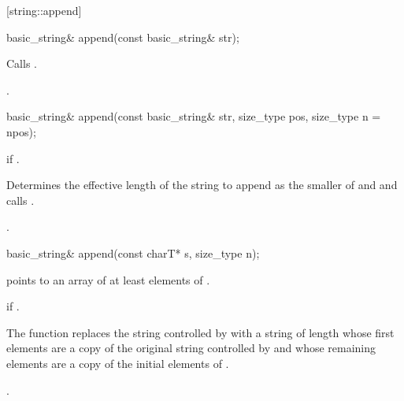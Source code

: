[string::append]{}

%
%
\begin{itemdecl}
basic_string&
  append(const basic_string& str);
\end{itemdecl}

\begin{itemdescr}
\pnum
\effects Calls .

\pnum
\returns
{}.
\end{itemdescr}

%
%
\begin{itemdecl}
basic_string&
  append(const basic_string& str, size_type pos, size_type n = npos);
\end{itemdecl}

\begin{itemdescr}
\pnum
\requires
{}

\pnum
\throws
{}
if
.

\pnum
\effects
Determines the effective length 
of the string to append as the smaller of  and
 and calls .

\pnum
\returns
{}.
\end{itemdescr}

%
%
\begin{itemdecl}
basic_string&
  append(const charT* s, size_type n);
\end{itemdecl}

\begin{itemdescr}
\pnum
\requires {} points to an array of at least  elements
of .

\pnum
\throws {} if .

\pnum
\effects The function replaces the string controlled by 
with a string of length  whose first 
elements are a copy of the original string controlled by 
and whose remaining elements are a copy of the initial  elements
of .

\pnum
\returns
{}.
\end{itemdescr}

